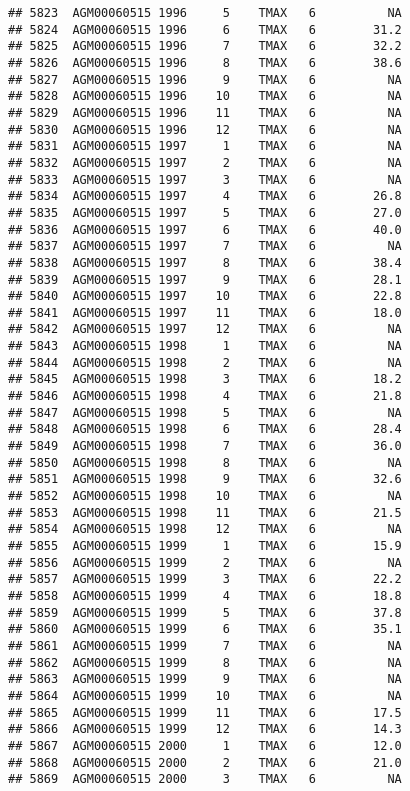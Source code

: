 \documentclass{article}\usepackage[]{graphicx}\usepackage[]{color}
\makeatletter
\newenvironment{kframe}{%
 \def\at@end@of@kframe{}%
 \ifinner\ifhmode%
  \def\at@end@of@kframe{\end{minipage}}%
  \begin{minipage}{\columnwidth}%
 \fi\fi%
 \def\FrameCommand##1{\hskip\@totalleftmargin \hskip-\fboxsep
 \colorbox{shadecolor}{##1}\hskip-\fboxsep
     \hskip-\linewidth \hskip-\@totalleftmargin \hskip\columnwidth}%
 \MakeFramed {\advance\hsize-\width
   \@totalleftmargin\z@ \linewidth\hsize
   \@setminipage}}%
 {\par\unskip\endMakeFramed%
 \at@end@of@kframe}
\newenvironment{knitrout}{}{} %
\makeatother
\begin{document}
\begin{knitrout}
\begin{kframe}
\begin{verbatim}
## 5823  AGM00060515 1996     5    TMAX   6          NA
## 5824  AGM00060515 1996     6    TMAX   6        31.2
## 5825  AGM00060515 1996     7    TMAX   6        32.2
## 5826  AGM00060515 1996     8    TMAX   6        38.6
## 5827  AGM00060515 1996     9    TMAX   6          NA
## 5828  AGM00060515 1996    10    TMAX   6          NA
## 5829  AGM00060515 1996    11    TMAX   6          NA
## 5830  AGM00060515 1996    12    TMAX   6          NA
## 5831  AGM00060515 1997     1    TMAX   6          NA
## 5832  AGM00060515 1997     2    TMAX   6          NA
## 5833  AGM00060515 1997     3    TMAX   6          NA
## 5834  AGM00060515 1997     4    TMAX   6        26.8
## 5835  AGM00060515 1997     5    TMAX   6        27.0
## 5836  AGM00060515 1997     6    TMAX   6        40.0
## 5837  AGM00060515 1997     7    TMAX   6          NA
## 5838  AGM00060515 1997     8    TMAX   6        38.4
## 5839  AGM00060515 1997     9    TMAX   6        28.1
## 5840  AGM00060515 1997    10    TMAX   6        22.8
## 5841  AGM00060515 1997    11    TMAX   6        18.0
## 5842  AGM00060515 1997    12    TMAX   6          NA
## 5843  AGM00060515 1998     1    TMAX   6          NA
## 5844  AGM00060515 1998     2    TMAX   6          NA
## 5845  AGM00060515 1998     3    TMAX   6        18.2
## 5846  AGM00060515 1998     4    TMAX   6        21.8
## 5847  AGM00060515 1998     5    TMAX   6          NA
## 5848  AGM00060515 1998     6    TMAX   6        28.4
## 5849  AGM00060515 1998     7    TMAX   6        36.0
## 5850  AGM00060515 1998     8    TMAX   6          NA
## 5851  AGM00060515 1998     9    TMAX   6        32.6
## 5852  AGM00060515 1998    10    TMAX   6          NA
## 5853  AGM00060515 1998    11    TMAX   6        21.5
## 5854  AGM00060515 1998    12    TMAX   6          NA
## 5855  AGM00060515 1999     1    TMAX   6        15.9
## 5856  AGM00060515 1999     2    TMAX   6          NA
## 5857  AGM00060515 1999     3    TMAX   6        22.2
## 5858  AGM00060515 1999     4    TMAX   6        18.8
## 5859  AGM00060515 1999     5    TMAX   6        37.8
## 5860  AGM00060515 1999     6    TMAX   6        35.1
## 5861  AGM00060515 1999     7    TMAX   6          NA
## 5862  AGM00060515 1999     8    TMAX   6          NA
## 5863  AGM00060515 1999     9    TMAX   6          NA
## 5864  AGM00060515 1999    10    TMAX   6          NA
## 5865  AGM00060515 1999    11    TMAX   6        17.5
## 5866  AGM00060515 1999    12    TMAX   6        14.3
## 5867  AGM00060515 2000     1    TMAX   6        12.0
## 5868  AGM00060515 2000     2    TMAX   6        21.0
## 5869  AGM00060515 2000     3    TMAX   6          NA

\end{verbatim}
\end{kframe}
\end{knitrout}
\end{document}
